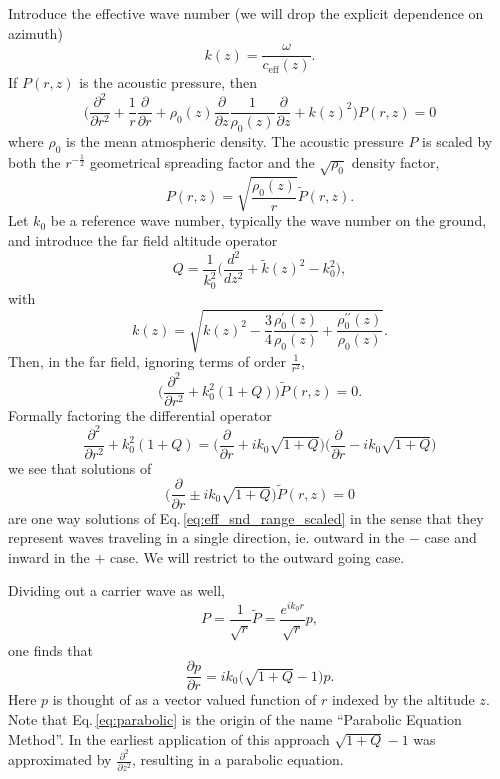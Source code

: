 Introduce the effective wave number (we will drop the explicit dependence on azimuth) 
\[
k(z)=\frac{\omega}{c_{\text{eff}}(z)}.
\]
If $P(r,z)$ is the acoustic pressure, then 
\begin{equation}\label{eq:eff_snd_helmholtz}
\Big(
\frac{\partial^2}{\partial r^2}+\frac{1}{r}\frac{\partial}{\partial r}
+
\rho_0(z)\frac{\partial}{\partial z}\frac{1}{\rho_0(z)}\frac{\partial}{\partial z}
+
k(z)^2
\Big)P(r,z)=0
\end{equation}
where $\rho_0$ is the mean atmospheric density. The acoustic pressure $P$ is scaled by both the $r^{-\frac{1}{2}}$ geometrical spreading factor and the $\sqrt{\rho_0}$ density factor, 
\begin{equation}\label{eq:scaled_P}
P(r,z)=\sqrt{\frac{\rho_0(z)}{r}}\tilde P(r,z).
\end{equation}
Let $k_0$ be a reference wave number, typically the wave number on the ground, and introduce the far field altitude operator 
\[
Q=\frac{1}{k_0^2}\Big(\frac{d^2}{d z^2}+\tilde k(z)^2-k_0^2\Big),
\]
with 
\begin{equation}\label{eq:wavenumber}
k(z)=\sqrt{k(z)^2-\frac{3}{4}\frac{\rho_0^\prime(z)}{\rho_0(z)}+\frac{\rho_0^{\prime\prime}(z)}{\rho_0(z)}}.
\end{equation}
Then, in the far field, ignoring terms of order $\frac{1}{r^2}$, 
\begin{equation}\label{eq:eff_snd_range_scaled}
\Big(\frac{\partial^2}{\partial r^2}+k_0^2(1+Q)\Big)\tilde P(r,z)=0.
\end{equation}
Formally factoring the differential operator
\[
\frac{\partial^2}{\partial r^2}+k_0^2(1+Q)
=
\Big(\frac{\partial}{\partial r}+ik_0\sqrt{1+Q}\Big)\Big(\frac{\partial}{\partial r}-ik_0\sqrt{1+Q}\Big)
\]
we see that solutions of 
\[
\Big(\frac{\partial}{\partial r}\pm ik_0\sqrt{1+Q}\Big) \tilde P(r,z)=0
\]
are one way solutions of Eq.\,\ref{eq:eff_snd_range_scaled} in the sense that they represent waves traveling in a single direction, ie. outward in the $-$ case and inward in the $+$ case. We will restrict to the outward going case. 

Dividing out a carrier wave as well,
\[
P =\frac{1}{\sqrt{r}} \tilde P =\frac{e^{ik_0r}}{\sqrt{r}} p,
\]
one finds that 
\begin{equation}\label{eq:parabolic}
\frac{\partial p}{\partial r}=ik_0\big(\sqrt{1+Q}-1\big)p. 
\end{equation}
Here $p$ is thought of as a vector valued function of $r$ indexed by the altitude $z$. Note that Eq.\,\ref{eq:parabolic} is the origin of the name ``Parabolic Equation Method''. In the earliest application of this approach $\sqrt{1+Q}-1$ was approximated by $\frac{\partial ^2}{\partial z^2}$, resulting in a parabolic equation. 

